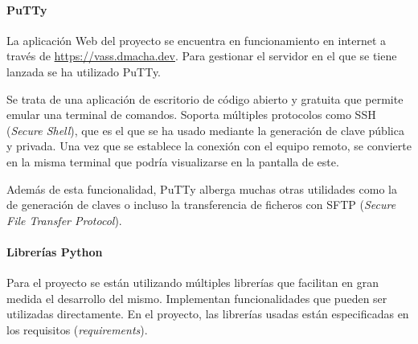 \paragraph{PuTTy}
La aplicación Web del proyecto se encuentra en funcionamiento en internet a
través de \url{https://vass.dmacha.dev}. Para gestionar el servidor en el que se
tiene lanzada se ha utilizado PuTTy.

Se trata de una aplicación de escritorio de código abierto y gratuita que
permite emular una terminal de comandos. Soporta múltiples protocolos como SSH
(\textit{Secure Shell}), que es el que se ha usado mediante la generación de
clave pública y privada. Una vez que se establece la conexión con el equipo
remoto, se convierte en la misma terminal que podría visualizarse en la pantalla
de este.

Además de esta funcionalidad, PuTTy alberga muchas otras utilidades como la de
generación de claves o incluso la transferencia de ficheros con SFTP
(\textit{Secure File Transfer Protocol}).

\paragraph{Librerías Python}
Para el proyecto se están utilizando múltiples librerías que facilitan en gran
medida el desarrollo del mismo. Implementan funcionalidades que pueden ser
utilizadas directamente. En el proyecto, las librerías usadas están
especificadas en los requisitos (\textit{requirements}).

